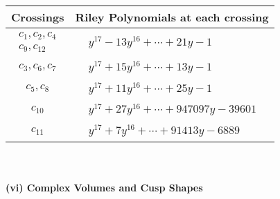 \documentclass[1p]{elsarticle_modified}
\theoremstyle{definition}
\begin{document}
\begin{tabular}{m{50pt}|m{274pt}}
Crossings & \hspace{64pt}Riley Polynomials at each crossing \\
\hline $$\begin{aligned}c_{1},c_{2},c_{4}\\c_{9},c_{12}\end{aligned}$$&$\begin{aligned}
&y^{17}-13 y^{16}+\cdots+21 y-1
\end{aligned}$\\
\hline $$\begin{aligned}c_{3},c_{6},c_{7}\end{aligned}$$&$\begin{aligned}
&y^{17}+15 y^{16}+\cdots+13 y-1
\end{aligned}$\\
\hline $$\begin{aligned}c_{5},c_{8}\end{aligned}$$&$\begin{aligned}
&y^{17}+11 y^{16}+\cdots+25 y-1
\end{aligned}$\\
\hline $$\begin{aligned}c_{10}\end{aligned}$$&$\begin{aligned}
&y^{17}+27 y^{16}+\cdots+947097 y-39601
\end{aligned}$\\
\hline $$\begin{aligned}c_{11}\end{aligned}$$&$\begin{aligned}
&y^{17}+7 y^{16}+\cdots+91413 y-6889
\end{aligned}$\\
\hline
\end{tabular}\\~\\
\newpage\flushleft \textbf{(vi) Complex Volumes and Cusp Shapes}
\end{document}
